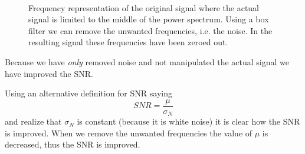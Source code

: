 \documentclass[a4paper, 10pt, final]{article}
\begin{document}
\begin{figure}[!h]
    \centering
    \hspace{1em}
    \hspace{1em}
    \\
    \caption[]{Frequency representation of the original signal where the
    actual signal is limited to the middle of the power spectrum. Using
    a box filter we can remove the unwanted frequencies, i.e. the noise.
    In the resulting signal these frequencies have been zeroed out.}
    \label{box_filter_model}
\end{figure}

Because we have \emph{only} removed noise and not manipulated the actual
signal we have improved the SNR.

Using an alternative definition for SNR saying
\begin{equation}
    SNR = \frac{\mu}{\sigma_N}
\end{equation}
and realize that $\sigma_N$ is constant (because it is white noise) it
is clear how the SNR is improved. When we remove the unwanted
frequencies the value of $\mu$ is decreased, thus the SNR is improved.
\end{document}
